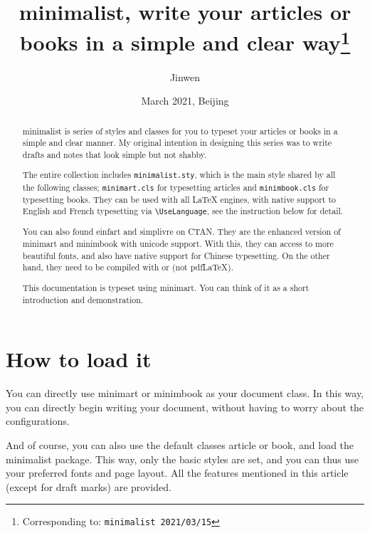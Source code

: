 \documentclass{minimart}
\providecommand{\minimalist}{\textsf{minimalist}}
\providecommand{\minimart}{\textsf{minimart}}
\providecommand{\minimbook}{\textsf{minimbook}}
\providecommand{\einfart}{\textsf{einfart}}
\providecommand{\simplivre}{\textsf{simplivre}}
\begin{document}
\title{\minimalist{}, write your articles or books in a simple and clear way\thanks{Corresponding to: \texttt{\minimalist{} 2021/03/15}}}
\author{Jinwen}
\date{March 2021, Beijing}

\maketitle

\begin{abstract}
    \minimalist{} is series of styles and classes for you to typeset your articles or books in a simple and clear manner. My original intention in designing this series was to write drafts and notes that look simple but not shabby.
    
    The entire collection includes \verb|minimalist.sty|, which is the main style shared by all the following classes; \verb|minimart.cls| for typesetting articles and \verb|minimbook.cls| for typesetting books. They can be used with all LaTeX engines, with native support to English and French typesetting via \lstinline|\UseLanguage|, see the instruction below for detail.

    You can also found \einfart{} and \simplivre{} on CTAN. They are the enhanced version of \minimart{} and \minimbook{} with unicode support. With this, they can access to more beautiful fonts, and also have native support for Chinese typesetting. On the other hand, they need to be compiled with  or  (not pdf\LaTeX).
    
    This documentation is typeset using \minimart{}. You can think of it as a short introduction and demonstration.
\end{abstract}

\tableofcontents

\section{How to load it}
You can directly use \minimart{} or \minimbook{} as your document class. In this way, you can directly begin writing your document, without having to worry about the configurations.


And of course, you can also use the default classes \textsf{article} or \textsf{book}, and load the \minimalist{} package. This way, only the basic styles are set, and you can thus use your preferred fonts and page layout. All the features mentioned in this article (except for draft marks) are provided.
\begin{code}
  \usepackage{minimalist}
\end{code}
\end{document}
